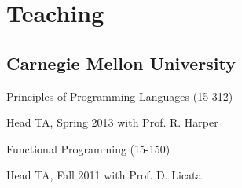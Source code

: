 \documentclass[10pt,letterpaper]{article}
\renewenvironment{itemize}{
  \begin{list}{}{
    \setlength{\leftmargin}{1.25em}
    \setlength{\itemsep}{0.25em}
    \setlength{\parskip}{0pt}
    \setlength{\parsep}{0.2em}
  }
}{
  \end{list}
}
\begin{document}
%


\section*{Teaching}
\subsection*{Carnegie Mellon University}
\begin{itemize}
  \item Principles of Programming Languages (15-312)
    \begin{itemize}
      \item Head TA, Spring 2013 with Prof. R. Harper
    \end{itemize}
  \item Functional Programming (15-150)
    \begin{itemize}
      \item Head TA, Fall 2011 with Prof. D. Licata
    \end{itemize}
\end{itemize}
\end{document}
